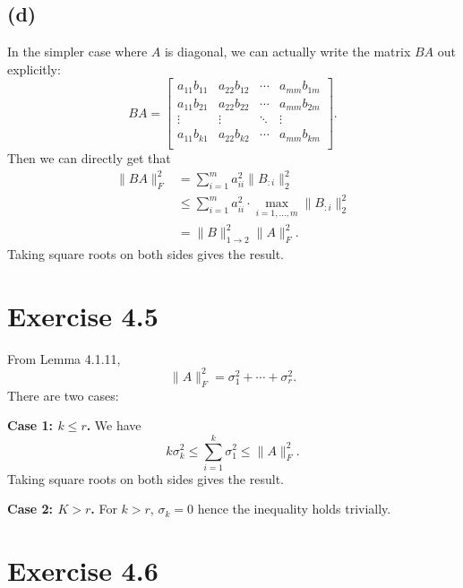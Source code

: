\subsection*{(d)}
In the simpler case where $A$ is diagonal, we can actually write the matrix $BA$ out explicitly: 
\[ BA = \begin{bmatrix}
a_{11}b_{11} & a_{22}b_{12} & \cdots & a_{mm}b_{1m} \\
a_{11}b_{21} & a_{22}b_{22} & \cdots & a_{mm}b_{2m} \\
\vdots & \vdots & \ddots & \vdots \\
a_{11}b_{k1} & a_{22}b_{k2} & \cdots & a_{mm}b_{km} \\
\end{bmatrix}. \]
Then we can directly get that 
\begin{align*}
	\lVert BA \rVert_{F}^2 
	&= \sum_{i = 1}^{m} a_{ii}^2 \lVert B_{:i} \rVert_{2}^2 \\
	&\leq \sum_{i = 1}^{m}a_{ii}^2 \cdot \max_{i = 1, \dots, m} \lVert B_{:i} \rVert_{2}^2 \\
	&= \lVert B \rVert_{1 \to 2}^2 \lVert A \rVert_{F}^2.
\end{align*}
Taking square roots on both sides gives the result.


\newpage
\section*{Exercise 4.5}
From Lemma 4.1.11, 
\[ \lVert A \rVert_{F}^2 = \sigma_1^2 + \cdots + \sigma_r^2. \]
There are two cases: 

\textbf{Case 1: $k \leq r$.} We have 
\[ k \sigma_k^2 \leq \sum_{i = 1}^{k} \sigma_1^2 \leq \lVert A \rVert_{F}^2. \]
Taking square roots on both sides gives the result.

\textbf{Case 2: $K > r$.} For $k > r$, $\sigma_k = 0$ hence the inequality holds trivially.


\newpage
\section*{Exercise 4.6}

